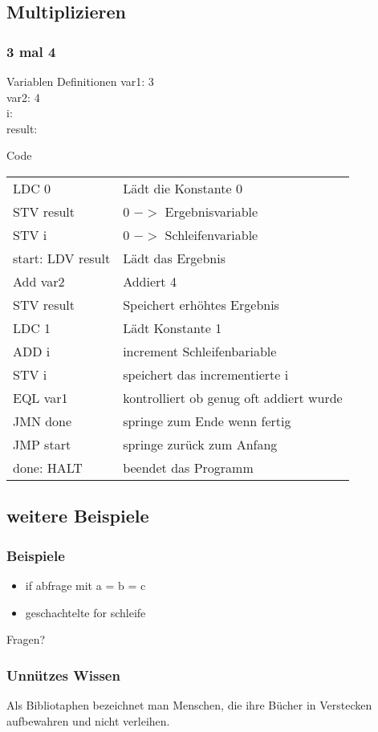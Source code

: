\documentclass{beamer}
\begin{document}
\subsection{Multiplizieren}
\begin{frame}
	\frametitle{3 mal 4}
	\begin{block}{Variablen Definitionen}
		var1: 3\\
		var2: 4\\
		i:\\
		result:
	\end{block}
\end{frame}

\begin{frame}
	\begin{block}{Code}
		\begin{tabular}{ll}
		 LDC 0 & Lädt die Konstante 0\\
		 STV result	& 0 $->$ Ergebnisvariable\\
		 STV i & 0 $->$ Schleifenvariable\\
		 start: LDV result & Lädt das Ergebnis\\
		 Add var2 & Addiert 4\\
		 STV result & Speichert erhöhtes Ergebnis\\
		 LDC 1 & Lädt Konstante 1\\
		 ADD i & increment Schleifenbariable\\
		 STV i & speichert das incrementierte i\\
		 EQL var1 & kontrolliert ob genug oft addiert wurde\\
		 JMN done & springe zum Ende wenn fertig\\
		 JMP start & springe zurück zum Anfang\\
		 done: HALT & beendet das Programm
		 \end{tabular}
	\end{block}
\end{frame}

\subsection{weitere Beispiele}
\begin{frame}
	\frametitle{Beispiele}
	\begin{block}{}
		\begin{itemize}
			\item if abfrage mit a = b = c\\
			\item geschachtelte for schleife
		\end{itemize}
	\end{block}
\end{frame}

\begin{frame}
	\begin{center}
		Fragen?
	\end{center}
\end{frame}

\begin{frame}
	\frametitle{Unnützes Wissen}
	\begin{center}
		Als Bibliotaphen  bezeichnet man Menschen, die ihre Bücher in 		Verstecken aufbewahren und nicht verleihen.
	\end{center}
\end{frame}
\end{document}
